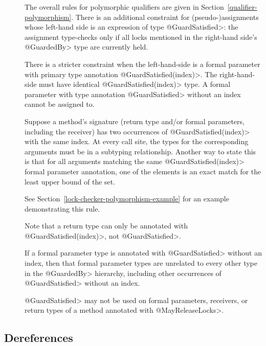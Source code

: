 \begin{description}

\item[]

  The overall rules for polymorphic qualifiers are given in
  Section~\ref{qualifier-polymorphism}.  There is an additional constraint
  for (pseudo-)assignments whose
  left-hand side is an expression of type
  \<@GuardSatisfied>:  the assignment type-checks only if all locks
  mentioned in the right-hand side's \<@GuardedBy> type are currently held.

  There is a stricter constraint when the left-hand-side is
  a formal parameter with primary type annotation \<@GuardSatisfied(index)>.
  The right-hand-side must have identical \<@GuardSatisfied(index)> type.
  A formal parameter with type annotation \<@GuardSatisfied> without an
  index cannot be assigned to.

  Suppose a method's signature (return type and/or formal parameters,
  including the receiver) has two occurrences of \<@GuardSatisfied(index)>
  with the same index.
  At every call site, the types for the corresponding arguments must be
  in a subtyping relationship.  Another way to state this is that for all
  arguments matching the same \<@GuardSatisfied(index)> formal parameter
  annotation, one of the elements is an exact match for the
  least upper bound of the set.

  See Section~\ref{lock-checker-polymorphism-example} for an example demonstrating this rule.

  Note that a return type can only be annotated with \<@GuardSatisfied(index)>,
  not \<@GuardSatisfied>.

  If a formal parameter type is
  annotated with \<@GuardSatisfied> without an index, then that formal parameter
  types are unrelated to every other type in the \<@GuardedBy> hierarchy,
  including other occurrences of \<@GuardSatisfied> without an index.

  \<@GuardSatisfied> may not be used on formal parameters, receivers, or
  return types of a method annotated with \<@MayReleaseLocks>.
\end{description}

\subsection{Dereferences\label{lock-type-checking-rules-dereferences}}


